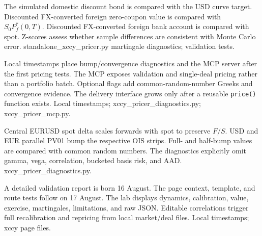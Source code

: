 {The simulated domestic discount bond is compared with the USD curve target.}
{Discounted FX-converted foreign zero-coupon value is compared with $S_0P_f^*(0,T)$.}
{Discounted FX-converted foreign bank account is compared with spot.}
{Z-scores assess whether sample differences are consistent with Monte Carlo error.}
{standalone\_xccy\_pricer.py martingale diagnostics; validation tests.}

{Local timestamps place bump/convergence diagnostics and the MCP server after the first pricing tests.}
{The MCP exposes validation and single-deal pricing rather than a portfolio batch.}
{Optional flags add common-random-number Greeks and convergence evidence.}
{The delivery interface grows only after a reusable \texttt{price()} function exists.}
{Local timestamps; xccy\_pricer\_diagnostics.py; xccy\_pricer\_mcp.py.}

{Central EURUSD spot delta scales forwards with spot to preserve $F/S$.}
{USD and EUR parallel PV01 bump the respective OIS strips.}
{Full- and half-bump values are compared with common random numbers.}
{The diagnostics explicitly omit gamma, vega, correlation, bucketed basis risk, and AAD.}
{xccy\_pricer\_diagnostics.py.}

{A detailed validation report is born 16 August.}
{The page context, template, and route tests follow on 17 August.}
{The lab displays dynamics, calibration, value, exercise, martingales, limitations, and raw JSON.}
{Editable correlations trigger full recalibration and repricing from local market/deal files.}
{Local timestamps; xccy page files.}
